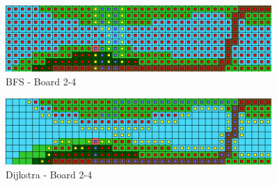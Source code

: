 \documentclass{article}
\begin{document}
	\begin{figure}[!htb]
		\caption{BFS - Board 2-4}
		\includegraphics[width=0.9\textwidth]{Bfs2-4.png}
	\end{figure}
	\begin{figure}[!htb]
		\caption{Dijkstra - Board 2-4}
		\includegraphics[width=0.9\textwidth]{Dijkstra-2-4.png}
	\end{figure}
\end{document}
